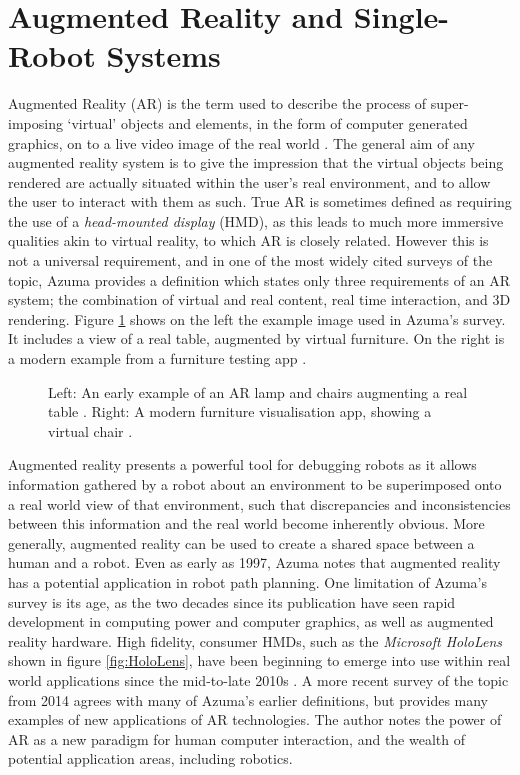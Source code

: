 \section{Augmented Reality and Single-Robot Systems} \label{AugmentedReality}
Augmented Reality (AR) is the term used to describe the process of super-imposing `virtual' objects and elements, in the form of computer generated graphics, on to a live video image of the real world \cite{Azuma:1997}. The general aim of any augmented reality system is to give the impression that the virtual objects being rendered are actually situated within the user's real environment, and to allow the user to interact with them as such. True AR is sometimes defined as requiring the use of a \textit{head-mounted display} (HMD), as this leads to much more immersive qualities akin to virtual reality, to which AR is closely related. However this is not a universal requirement, and in one of the most widely cited surveys of the topic, Azuma \cite{Azuma:1997} provides a definition which states only three requirements of an AR system; the combination of virtual and real content, real time interaction, and 3D rendering. Figure \ref{fig:ARFurniture} shows on the left the example image used in Azuma's \cite{Azuma:1997} survey. It includes a view of a real table, augmented by virtual furniture. On the right is a modern example from a furniture testing app \cite{SayDuck}.

\begin{figure}[h]
	\centering
	\decoRule
	\caption[AR Furniture Visualisations \cite{Azuma:1997} \cite{SayDuck}.]{Left: An early example of an AR lamp and chairs augmenting a real table \cite{Azuma:1997}. Right: A modern furniture visualisation app, showing a virtual chair \cite{SayDuck}.}
	\label{fig:ARFurniture}
\end{figure}

Augmented reality presents a powerful tool for debugging robots as it allows information gathered by a robot about an environment to be superimposed onto a real world view of that environment, such that discrepancies and inconsistencies between this information and the real world become inherently obvious. More generally, augmented reality can be used to create a shared space between a human and a robot. Even as early as 1997, Azuma \cite{Azuma:1997} notes that augmented reality has a potential application in robot path planning. One limitation of Azuma's survey is its age, as the two decades since its publication have seen rapid development in computing power and computer graphics, as well as augmented reality hardware. High fidelity, consumer HMDs, such as the \textit{Microsoft HoloLens} shown in figure \ref{fig:HoloLens}, have been beginning to emerge into use within real world applications since the mid-to-late 2010s \cite{HoloLens}. A more recent survey of the topic from 2014 \cite{Billinghurst:2014} agrees with many of Azuma's earlier definitions, but provides many examples of new applications of AR technologies. The author notes the power of AR as a new paradigm for human computer interaction, and the wealth of potential application areas, including robotics.

